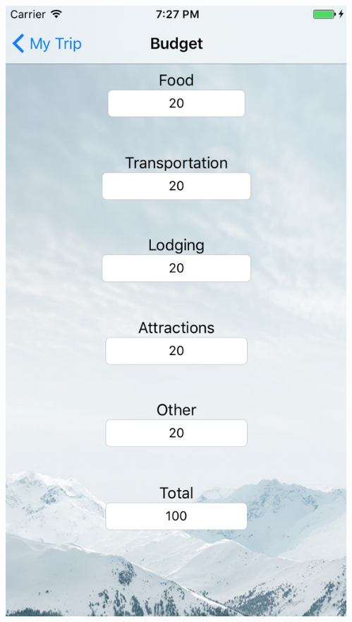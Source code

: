\documentclass{beamer}
\begin{document}
\begin{frame}
\begin{columns}
\begin{column}{0.3\textwidth}
\begin{center}
        \end{center}
    \end{column}
    \begin{column}{0.3\textwidth}  %
        \begin{center}
            \includegraphics[scale=0.3]{budget}
        \end{center}
    \end{column}
\end{columns}
\end{frame}
\end{document}
